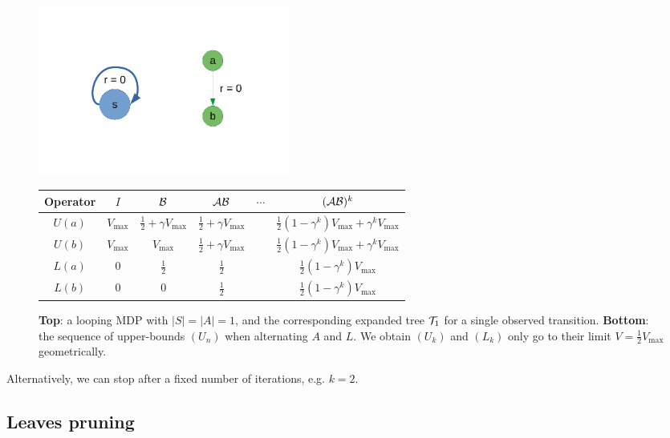 \documentclass{article}
\begin{document}
\begin{figure}
    \centering
    \includegraphics[trim=2cm 2cm 2cm 2cm, clip, width=0.4\textwidth]{img/simple_loop.pdf}\\
    \begin{tabular}{cccccc}
         \toprule
         Operator & $I$ & $\mathcal{B}$ & $\mathcal{A}\mathcal{B}$ & $\cdots$ & $(\mathcal{A}\mathcal{B})^k$ \\
         \midrule
         $U(a)$ & $V_{\max}$ & $\frac{1}{2} + \gamma V_{\max}$ & $\frac{1}{2} + \gamma V_{\max}$ && $\frac{1}{2}(1-\gamma^k)V_{\max} + \gamma^k V_{\max}$\\
         $U(b)$ & $V_{\max}$ & $V_{\max}$ & $\frac{1}{2} + \gamma V_{\max}$ && $\frac{1}{2}(1-\gamma^k)V_{\max} + \gamma^k V_{\max}$\\
         $L(a)$ & $0$ & $\frac{1}{2}$ & $\frac{1}{2}$ && $\frac{1}{2}(1-\gamma^k)V_{\max}$\\
		 $L(b)$ & $0$ & $0$ & $\frac{1}{2}$ && $\frac{1}{2}(1-\gamma^k)V_{\max}$\\
         \bottomrule
    \end{tabular}
    \caption{\textbf{Top}: a looping MDP with $|S|=|A|=1$, and the corresponding expanded tree $\mathcal{T}_1$ for a single observed transition. \textbf{Bottom}: the sequence of upper-bounds $(U_n)$ when alternating $A$ and $L$. We obtain $(U_k)$ and $(L_k)$ only go to their limit $V = \frac{1}{2}V_{\max}$ geometrically.}
    \label{fig:simple_loop}
\end{figure}

Alternatively, we can stop after a fixed number of iterations, e.g. $k=2$.

\subsection{Leaves pruning}
\label{sec:pruning}
\end{document}
